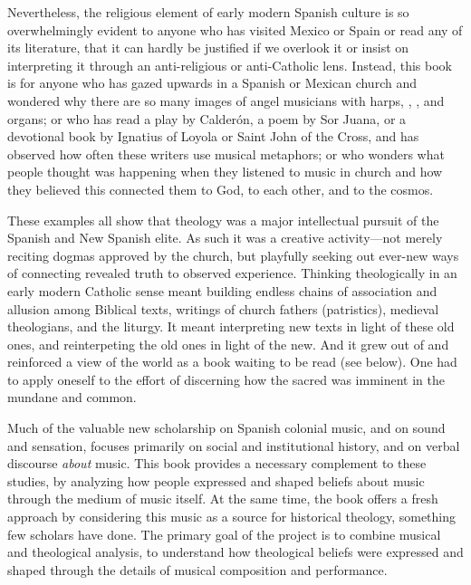 Nevertheless, the religious element of early modern Spanish culture is so
overwhelmingly evident to anyone who has visited Mexico or Spain or read any of
its literature, that it can hardly be justified if we overlook it or insist on
interpreting it through an anti-religious or anti-Catholic lens.
Instead, this book is for anyone who has gazed upwards in a Spanish or Mexican
church and wondered why there are so many images of angel musicians with harps,
, , and organs; or who has read a play by
Calderón, a poem by Sor Juana, or a devotional book by Ignatius of Loyola or
Saint John of the Cross, and has observed how often these writers use musical
metaphors; or who wonders what people thought was happening when they listened
to music in church and how they believed this connected them to God, to each
other, and to the cosmos.

These examples all show that theology was a major intellectual pursuit of the
Spanish and New Spanish elite.
As such it was a creative activity---not merely reciting dogmas
approved by the church, but playfully seeking out ever-new ways of connecting
revealed truth to observed experience.
Thinking theologically in an early modern Catholic sense meant building 
endless chains of association and allusion among Biblical texts, writings of
church fathers (patristics), medieval theologians, and the liturgy. 
It meant interpreting new texts in light of these old ones, and reinterpeting
the old ones in light of the new.
And it grew out of and reinforced a view of the world as a book waiting to be
read (see below).
One had to apply oneself to the effort of discerning how the sacred was
imminent in the mundane and common.%

Much of the valuable new scholarship on Spanish colonial music, and on sound
and sensation, focuses primarily on social and institutional history, and on
verbal discourse \emph{about} music.%
    \Autocites{Baker:Harmony}{BakerKnighton:MusicUrbanSociety}
    {Irving:Colonial}{RamosKittrell:PlayingCathedral}
    {DellAntonio:Listening}
This book provides a necessary complement to these studies, by analyzing how
people expressed and shaped beliefs about music through the medium of music
itself.
At the same time, the book offers a fresh approach by considering this music as
a source for historical theology, something few scholars have done.
The primary goal of the project is to combine musical and theological analysis,
to understand how theological beliefs were expressed and shaped through the
details of musical composition and performance.

